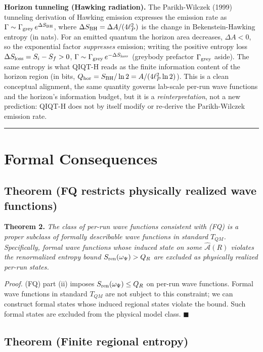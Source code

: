 \documentclass[11pt,a4paper]{article}
\begin{document}
\textbf{Horizon tunneling (Hawking radiation).} The Parikh-Wilczek (1999) tunneling derivation of Hawking emission expresses the emission rate as $\Gamma \sim \Gamma_{\rm grey}\, e^{\Delta S_{\rm BH}}$, where $\Delta S_{\rm BH} = \Delta A/(4\ell_P^2)$ is the change in Bekenstein-Hawking entropy (in nats). For an emitted quantum the horizon area decreases, $\Delta A < 0$, so the exponential factor \emph{suppresses} emission; writing the positive entropy loss $\Delta S_{\rm loss} = S_i - S_f > 0$, $\Gamma \sim \Gamma_{\rm grey}\, e^{-\Delta S_{\rm loss}}$ (greybody prefactor $\Gamma_{\rm grey}$ aside). The same entropy is what QIQT-H reads as the finite information content of the horizon region (in bits, $Q_{\rm hor} = S_{\rm BH}/\ln 2 = A/(4\ell_P^2 \ln 2)$). This is a clean conceptual alignment, the same quantity governs lab-scale per-run wave functions and the horizon's information budget, but it is a \emph{reinterpretation}, not a new prediction: QIQT-H does not by itself modify or re-derive the Parikh-Wilczek emission rate.

\medskip\hrule\medskip

\section{Formal Consequences}

\subsection{Theorem (FQ restricts physically realized wave functions)}

\textbf{Theorem 2.} \emph{The class of per-run wave functions consistent with (FQ) is a proper subclass of formally describable wave functions in standard $T_{QM}$. Specifically, formal wave functions whose induced state on some $\hat{\mathcal{A}}(R)$ violates the renormalized entropy bound $S_{\rm ren}(\omega_\Psi) > Q_R$ are excluded as physically realized per-run states.}

\emph{Proof.} (FQ) part (ii) imposes $S_{\rm ren}(\omega_\Psi) \le Q_R$ on per-run wave functions. Formal wave functions in standard $T_{QM}$ are not subject to this constraint; we can construct formal states whose induced regional states violate the bound. Such formal states are excluded from the physical model class. $\blacksquare$

\subsection{Theorem (Finite regional entropy)}
\end{document}
